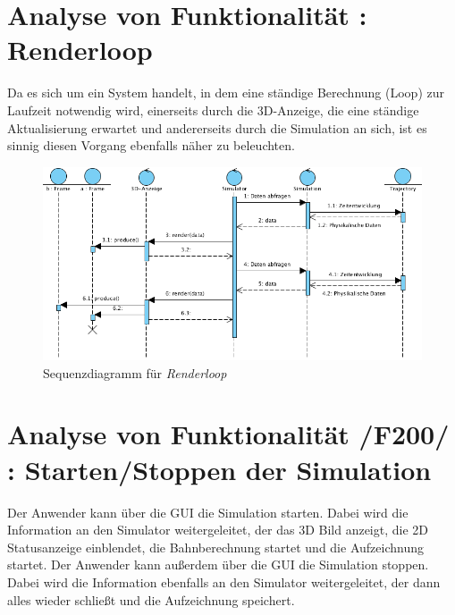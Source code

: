 
\section{Analyse von Funktionalität :  Renderloop}
Da es sich um ein System handelt, in dem eine ständige Berechnung (Loop) zur Laufzeit notwendig wird, einerseits durch die 3D-Anzeige, die eine ständige Aktualisierung erwartet und andererseits durch
die Simulation an sich, ist es sinnig diesen Vorgang ebenfalls näher zu beleuchten.

\begin{figure}
\includegraphics[width=16cm]{bilder/render_loop}
\caption{Sequenzdiagramm für \textit{Renderloop}}
\label{labelname}
\end{figure}
\section{Analyse von Funktionalität /F200/ :  Starten/Stoppen der Simulation}
Der Anwender kann über die GUI die Simulation starten. Dabei wird die Information an den Simulator weitergeleitet, der das 3D Bild anzeigt, die 2D Statusanzeige einblendet, die Bahnberechnung startet und die Aufzeichnung startet. 
Der Anwender kann außerdem über die GUI die Simulation stoppen. Dabei wird die Information ebenfalls an den Simulator weitergeleitet, der dann alles wieder schließt und die Aufzeichnung speichert.

